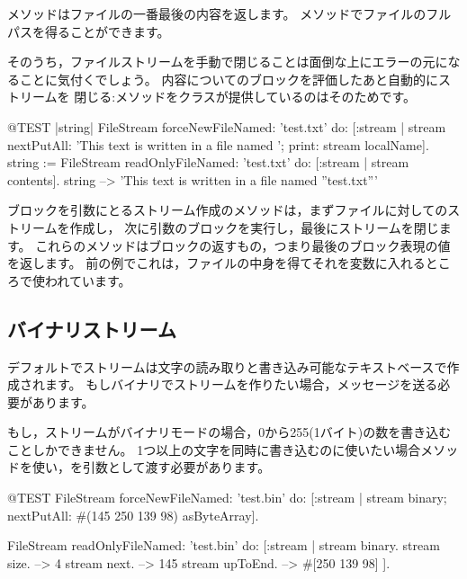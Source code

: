 \documentclass[a4paper,10pt,twoside]{book}
\begin{document}
メソッドはファイルの一番最後の内容を返します。
メソッドでファイルのフルパスを得ることができます。


そのうち，ファイルストリームを手動で閉じることは面倒な上にエラーの元になることに気付くでしょう。
内容についてのブロックを評価したあと自動的にストリームを
閉じる:メソッドをクラスが提供しているのはそのためです。


\begin{code}{@TEST |string|}
FileStream
    forceNewFileNamed: 'test.txt'
    do: [:stream |
        stream
            nextPutAll: 'This text is written in a file named ';
            print: stream localName].
string := FileStream
            readOnlyFileNamed: 'test.txt'
            do: [:stream | stream contents].
string --> 'This text is written in a file named ''test.txt'''
\end{code}

ブロックを引数にとるストリーム作成のメソッドは，まずファイルに対してのストリームを作成し，
次に引数のブロックを実行し，最後にストリームを閉じます。
これらのメソッドはブロックの返すもの，つまり最後のブロック表現の値を返します。
前の例でこれは，ファイルの中身を得てそれを変数に入れるところで使われています。

\subsection{バイナリストリーム}


デフォルトでストリームは文字の読み取りと書き込み可能なテキストベースで作成されます。
もしバイナリでストリームを作りたい場合，メッセージを送る必要があります。


もし，ストリームがバイナリモードの場合，0から255(1バイト)の数を書き込むことしかできません。
1つ以上の文字を同時に書き込むのに使いたい場合メソッドを使い，を引数として渡す必要があります。

\begin{code}{@TEST}
FileStream
  forceNewFileNamed: 'test.bin'
  do: [:stream |
          stream
            binary;
            nextPutAll: #(145 250 139 98) asByteArray].

FileStream
  readOnlyFileNamed: 'test.bin'
  do: [:stream |
          stream binary.
          stream size.         --> 4
          stream next.         --> 145
          stream upToEnd. --> #[250 139 98]
      ].
\end{code}
\end{document}
